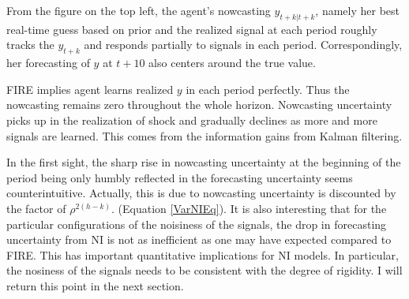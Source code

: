 \documentclass[12pt]{article}
\begin{document}
	From the figure on the top left, the agent's nowcasting $y_{t+k|t+k}$, namely her best real-time guess based on prior and the realized signal at each period roughly tracks the $y_{t+k}$ and responds partially to signals in each period. Correspondingly, her forecasting of $y$ at $t+10$ also centers around the true value. 
	
	FIRE implies agent learns realized $y$ in each period perfectly. Thus the nowcasting remains zero throughout the whole horizon. Nowcasting uncertainty picks up in the realization of shock and gradually declines as more and more signals are learned. This comes from the information gains from Kalman filtering. 
	
	In the first sight, the sharp rise in nowcasting uncertainty at the beginning of the period being only humbly reflected in the forecasting uncertainty seems counterintuitive. Actually, this is due to nowcasting uncertainty is discounted by the factor of $\rho^{2(h-k)}$.  (Equation \ref{VarNIEq}). It is also interesting that for the particular configurations of the noisiness of the signals, the drop in forecasting uncertainty from NI is not as inefficient as one may have expected compared to FIRE.  This has important quantitative implications for NI models. In particular, the nosiness of the signals needs to be consistent with the degree of rigidity. I will return this point in the next section.  
	
\end{document}
